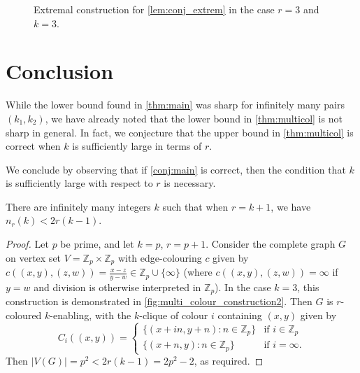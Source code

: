 \documentclass[12pt,a4paper]{article}
\begin{document}
\begin{figure}[h]

    \caption{Extremal construction for \cref{lem:conj_extrem} in the case $r=3$ and $k=3$.}
    \label{fig:multi_colour_construction1}
\end{figure}

\section{Conclusion}

While the lower bound found in \cref{thm:main} was sharp for infinitely many pairs $(k_1, k_2)$, we have already noted that the lower bound in \cref{thm:multicol} is not sharp in general. In fact, we conjecture that the upper bound in \cref{thm:multicol} is correct when $k$ is sufficiently large in terms of $r$.
\conjMain*

We conclude by observing that if \cref{conj:main} is correct, then the condition that $k$ is sufficiently large with respect to $r$ is necessary.
\begin{lemma}\label{lem:example2}
    There are infinitely many integers $k$ such that when $r=k+1$, we have $n_{r}(k) < 2r(k-1)$.
\end{lemma}
\begin{proof}
    Let $p$ be prime, and let $k=p$, $r = p+1$. Consider the complete graph $G$ on vertex set $V = \mathbb{Z}_p \times \mathbb{Z}_p$ with edge-colouring $c$ given by $c((x,y),(z,w)) = \frac{x-z}{y-w} \in \mathbb{Z}_p \cup \{\infty\}$ (where $c((x,y),(z,w)) = \infty$ if $y = w$ and division is otherwise interpreted in $\mathbb{Z}_p$). In the case $k=3$, this construction is demonstrated in \cref{fig:multi_colour_construction2}. Then $G$ is $r$-coloured $k$-enabling, with the $k$-clique of colour $i$ containing $(x,y)$ given by 
    \begin{equation*}
        C_i((x,y)) = \begin{cases}
            \{(x+in, y+n): n \in \mathbb{Z}_p\} &\text{if } i \in \mathbb{Z}_p \\
            \{(x+n, y): n \in \mathbb{Z}_p\} &\text{if } i = \infty.
        \end{cases}
    \end{equation*}
    Then $|V(G)| = p^2 < 2r(k-1) = 2p^2-2$, as required.
\end{proof}
\end{document}
